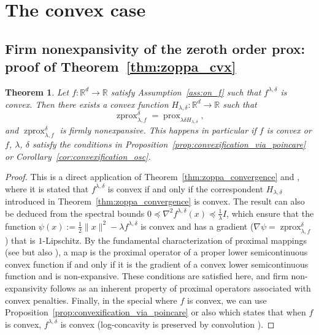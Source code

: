 \documentclass{article}
\newtheorem{theorem}{Theorem}
\newcommand{\prox}{\ensuremath{\operatorname{prox}}}
\newcommand{\zprox}{\ensuremath{\operatorname{zprox}}}
\begin{document}
\section{The convex case}

\subsection{Firm nonexpansivity of the zeroth order prox: proof of Theorem~\ref{thm:zoppa_cvx}}\label{app:proof_of_zoppa_cvx}

\begin{theorem}\label{thm:fne}
Let $f:\mathbb{R}^d\to\mathbb{R}$ satisfy Assumption~\ref{ass:on_f} such that $f^{\lambda,\delta}$ is convex. Then there exists a  convex function $H_{\lambda,\delta}:\mathbb{R}^d\to\mathbb{R}$ such that
\[
\zprox_{\lambda, f}^{\delta}=\prox_{\lambda \delta H_{\lambda,\delta}},
\]
and $\zprox_{\lambda, f}^{\delta}$ is firmly nonexpansive. This happens in particular if $f$ is convex or $f$, $\lambda$, $\delta$ satisfy the conditions in Proposition~\ref{prop:convexification_via_poincare} or Corollary~\ref{cor:convexification_osc}.
\end{theorem}

\begin{proof} This is a direct application of Theorem~\ref{thm:zoppa_convergence} and \cite[Lemma 2]{Gribonval2013}, where it is stated that $f^{\lambda,\delta}$ is convex if and only if the correspondent $H_{\lambda,\delta}$ introduced in Theorem~\ref{thm:zoppa_convergence} is convex. The result can also be deduced from the spectral bounds $0\preceq \nabla^2 f^{\lambda,\delta}(x)\preceq \frac1\lambda I$, which ensure that the function $\psi(x) := \frac{1}{2}\|x\|^2 - \lambda f^{\lambda,\delta}$ is convex and has a gradient ($\nabla \psi = \zprox_{\lambda,f}^\delta$) that is $1$-Lipschitz. By the fundamental characterization of proximal mappings (see \cite[Proposition 1]{gribonval2020characterization, lauga2026} but also \cite[Corollary 10.c]{moreau1965}), a map is the proximal operator of a proper lower semicontinuous convex function if and only if it is the gradient of a convex lower semicontinuous function and is non-expansive. These conditions are satisfied here, and firm non-expansivity follows as an inherent property of proximal operators associated with convex penalties. Finally, in the special where $f$ is convex, we can use Proposition~\ref{prop:convexification_via_poincare} or also \cite[Proposition 23]{lauga2026} which states that when $f$ is convex, $f^{\lambda,\delta}$ is convex (log-concavity is preserved by convolution \cite[Proposition 3.5]{SaumardWellner2014}).
\end{proof}
\end{document}
